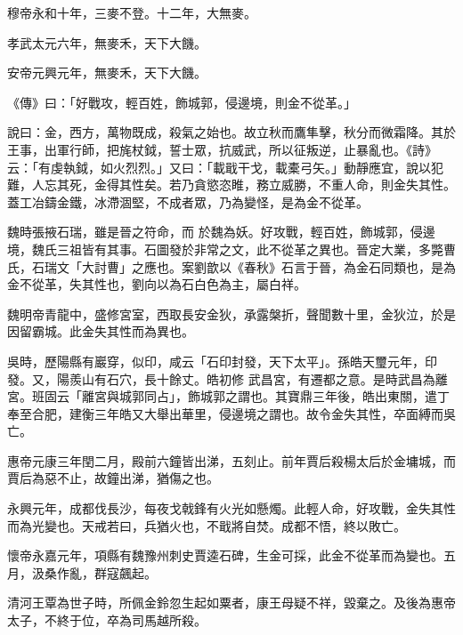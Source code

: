 \begin{pinyinscope}
 穆帝永和十年，三麥不登。十二年，大無麥。



 孝武太元六年，無麥禾，天下大饑。



 安帝元興元年，無麥禾，天下大饑。



 《傳》曰：「好戰攻，輕百姓，飾城郭，侵邊境，則金不從革。」



 說曰：金，西方，萬物既成，殺氣之始也。故立秋而鷹隼擊，秋分而微霜降。其於王事，出軍行師，把旄杖鉞，誓士眾，抗威武，所以征叛逆，止暴亂也。《詩》云：「有虔執鉞，如火烈烈。」又曰：「載戢干戈，載橐弓矢。」動靜應宜，說以犯難，人忘其死，金得其性矣。若乃貪慾恣睢，務立威勝，不重人命，則金失其性。蓋工冶鑄金鐵，冰滯涸堅，不成者眾，乃為變怪，是為金不從革。



 魏時張掖石瑞，雖是晉之符命，而
 於魏為妖。好攻戰，輕百姓，飾城郭，侵邊境，魏氏三祖皆有其事。石圖發於非常之文，此不從革之異也。晉定大業，多斃曹氏，石瑞文「大討曹」之應也。案劉歆以《春秋》石言于晉，為金石同類也，是為金不從革，失其性也，劉向以為石白色為主，屬白祥。



 魏明帝青龍中，盛修宮室，西取長安金狄，承露槃折，聲聞數十里，金狄泣，於是因留霸城。此金失其性而為異也。



 吳時，歷陽縣有巖穿，似印，咸云「石印封發，天下太平」。孫皓天璽元年，印發。又，陽羨山有石穴，長十餘丈。皓初修
 武昌宮，有遷都之意。是時武昌為離宮。班固云「離宮與城郭同占」，飾城郭之謂也。其寶鼎三年後，皓出東關，遣丁奉至合肥，建衡三年皓又大舉出華里，侵邊境之謂也。故令金失其性，卒面縛而吳亡。



 惠帝元康三年閏二月，殿前六鐘皆出涕，五刻止。前年賈后殺楊太后於金墉城，而賈后為惡不止，故鐘出涕，猶傷之也。



 永興元年，成都伐長沙，每夜戈戟鋒有火光如懸燭。此輕人命，好攻戰，金失其性而為光變也。天戒若曰，兵猶火也，不戢將自焚。成都不悟，終以敗亡。



 懷帝永嘉元年，項縣有魏豫州刺史賈逵石碑，生金可採，此金不從革而為變也。五月，汲桑作亂，群寇飆起。



 清河王覃為世子時，所佩金鈴忽生起如粟者，康王母疑不祥，毀棄之。及後為惠帝太子，不終于位，卒為司馬越所殺。




\end{pinyinscope}
